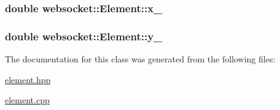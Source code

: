 \subsubsection[{\texorpdfstring{x\+\_\+}{x_}}]{\setlength{\rightskip}{0pt plus 5cm}double websocket\+::\+Element\+::x\+\_\+\hspace{0.3cm}{\ttfamily [protected]}}\hypertarget{classwebsocket_1_1Element_adb51cfefd07378c784d30340c449a224}{}\label{classwebsocket_1_1Element_adb51cfefd07378c784d30340c449a224}
\subsubsection[{\texorpdfstring{y\+\_\+}{y_}}]{\setlength{\rightskip}{0pt plus 5cm}double websocket\+::\+Element\+::y\+\_\+\hspace{0.3cm}{\ttfamily [protected]}}\hypertarget{classwebsocket_1_1Element_a61ea05afb0180339005d1c96786a60ce}{}\label{classwebsocket_1_1Element_a61ea05afb0180339005d1c96786a60ce}


The documentation for this class was generated from the following files\+:\begin{DoxyCompactItemize}
\item 
\hyperlink{element_8hpp}{element.\+hpp}\item 
\hyperlink{element_8cpp}{element.\+cpp}\end{DoxyCompactItemize}
